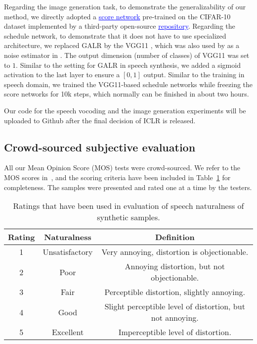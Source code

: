 Regarding the image generation task, to demonstrate the generalizability of our method, we directly adopted a \href{https://heibox.uni-heidelberg.de/d/01207c3f6b8441779abf/}{\textcolor{blue}{\underline{score network}}} pre-trained on the CIFAR-10 dataset implemented by a third-party open-source \href{https://github.com/pesser/pytorch_diffusion}{\textcolor{blue}{\underline{repository}}}. Regarding the schedule network, to demonstrate that it does not have to use specialized architecture, we replaced GALR by the VGG11 \citep{karen2014}, which was also used by as a noise estimator in \citep{san2021noise}. The output dimension (number of classes) of VGG11 was set to $1$. Similar to the setting for GALR in speech synthesis, we added a sigmoid activation to the last layer to ensure a $[0,1]$ output. Similar to the training in speech domain, we trained the VGG11-based schedule networks while freezing the score networks for 10k steps, which normally can be finished in about two hours.

Our code for the speech vocoding and the image generation experiments will be uploaded to Github after the final decision of ICLR is released.

\subsection{Crowd-sourced subjective evaluation}
All our Mean Opinion Score (MOS) tests were crowd-sourced. We refer to the MOS scores in~\citep{protasio_ribeiro_crowdmos_2011}, and the scoring criteria have been included in Table~\ref{matrix:naturalness} for completeness. The samples were presented and rated one at a time by the testers.

\begin{table}[t]
\centering
  \caption{Ratings that have been used in evaluation of speech naturalness of synthetic samples.}
  \label{matrix:naturalness}
  \begin{tabular}{ccc}
  \toprule
  Rating & Naturalness & Definition                           \\
  \midrule
  1      & Unsatisfactory        &  Very annoying, distortion is objectionable. \\
  2      & Poor       &  Annoying distortion, but not objectionable. \\
  3      & Fair       &  Perceptible distortion, slightly annoying.\\
  4      & Good       & Slight perceptible level of distortion, but not annoying.\\
  5      & Excellent  & Imperceptible level of distortion.\\
  \bottomrule
  \end{tabular}
  \end{table}

